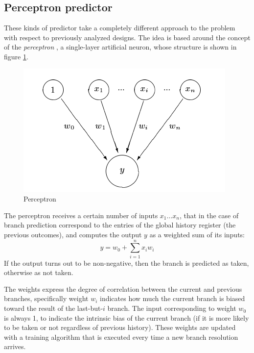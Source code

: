 \subsection{Perceptron predictor}
These kinds of predictor take a completely different approach to the problem with respect to previously analyzed designs. The idea is based around the concept of the \emph{perceptron} \cite{jimenez01}, a single-layer artificial neuron, whose structure is shown in figure \ref{fig:perceptron}.
\begin{figure}[hbtp]
  \centering
  \includegraphics[width=.5\textwidth]{img/perceptron.pdf}
  \caption{Perceptron}
  \label{fig:perceptron}
\end{figure}
The perceptron receives a certain number of inputs $x_1 \ldots x_n$, that in the case of branch prediction correspond to the entries of the global history register (the previous outcomes), and computes the output $y$ as a weighted sum of its inputs:
\begin{equation*}
  y = w_0 + \sum_{i=1}^n x_i w_i
\end{equation*}
If the output turns out to be non-negative, then the branch is predicted as taken, otherwise as not taken.

The weights express the degree of correlation between the current and previous branches, specifically weight $w_i$ indicates how much the current branch is biased toward the result of the last-but-$i$ branch. The input corresponding to weight $w_0$ is always 1, to indicate the intrinsic bias of the current branch (if it is more likely to be taken or not regardless of previous history). These weights are updated with a training algorithm that is executed every time a new branch resolution arrives.


